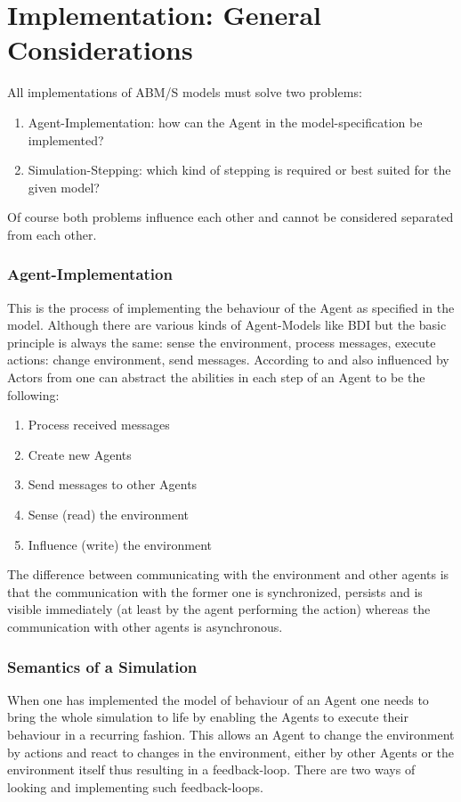 \section{Implementation: General Considerations}
All implementations of ABM/S models must solve two problems:

\begin{enumerate}
\item Agent-Implementation: how can the Agent in the model-specification be implemented?
\item Simulation-Stepping: which kind of stepping is required or best suited for the given model?
\end{enumerate}

Of course both problems influence each other and cannot be considered separated from each other.

\subsubsection{Agent-Implementation}
This is the process of implementing the behaviour of the Agent as specified in the model. Although there are various kinds of Agent-Models like BDI but the basic principle is always the same: sense the environment, process messages, execute actions: change environment, send messages. According to \cite{wooldridge_introduction_2009} and also influenced by Actors from \cite{agha_actors:_1986} one can abstract the abilities in each step of an Agent to be the following:

\begin{enumerate}
\item Process received messages
\item Create new Agents
\item Send messages to other Agents
\item Sense (read) the environment
\item Influence (write) the environment
\end{enumerate}

The difference between communicating with the environment and other agents is that the communication with the former one is synchronized, persists and is visible immediately (at least by the agent performing the action) whereas the communication with other agents is asynchronous.

\subsubsection{Semantics of a Simulation}
When one has implemented the model of behaviour of an Agent one needs to bring the whole simulation to life by enabling the Agents to execute their behaviour in a recurring fashion. This allows an Agent to change the environment by actions and react to changes in the environment, either by other Agents or the environment itself thus resulting in a feedback-loop. There are two ways of looking and implementing such feedback-loops. 


